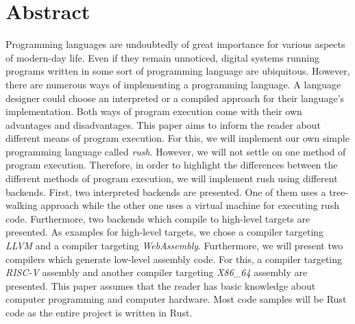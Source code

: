 \chapter{Abstract}

Programming languages are undoubtedly of great importance for various aspects of
modern-day life. Even if they remain unnoticed, digital systems running programs
written in some sort of programming language are ubiquitous.
\newline
However, there are numerous ways of implementing a programming language. A
language designer could choose an interpreted or a compiled approach for their
language's implementation. Both ways of program execution come with their own
advantages and disadvantages.
\newline
This paper aims to inform the reader about different means of program execution.
For this, we will implement our own simple programming language called \emph{rush}.
However, we will not settle on one method of program execution. Therefore, in
order to highlight the differences between the different methods of program
execution, we will implement rush using different backends.
\newline
First, two interpreted backends are presented. One of them uses a tree-walking
approach while the other one uses a virtual machine for executing rush code.
Furthermore, two backends which compile to high-level targets are presented. As
examples for high-level targets, we chose a compiler targeting \emph{LLVM} and a
compiler targeting \emph{WebAssembly}. Furthermore, we will present two compilers
which generate low-level assembly code. For this, a compiler targeting \emph{RISC-V}
assembly and another compiler targeting \emph{X86\_64} assembly are presented.
\newline
This paper assumes that the reader has basic knowledge about computer
programming and computer hardware. Most code samples will be Rust code as the
entire project is written in Rust.
